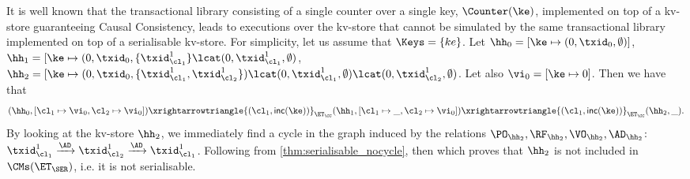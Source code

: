 It is well known that the transactional library consisting of a single counter over a single 
key, $\Counter(\ke)$, implemented on top of a kv-store guaranteeing Causal Consistency, 
leads to executions over the kv-store that cannot be simulated by the same transactional 
library implemented on top of a serialisable kv-store. 
For simplicity, let us assume that $\Keys = \{ke\}$.
Let $\hh_{0} = [\ke \mapsto (0, \txid_{0}, \emptyset)]$,  
$\hh_1 = [\ke \mapsto (0, \txid_{0}, \{\txid_{\cl_1}^{1}\} \lcat (0, \txid_{\cl_1}^{1}, \emptyset)$, 
$\hh_2 = [\ke \mapsto (0, \txid_{0}, \{\txid_{\cl_1}^{1}, \txid_{\cl_2}^{1}\}) \lcat (0, \txid_{\cl_1}^{1}, \emptyset) 
\lcat (0, \txid_{\cl_2}^{1}, \emptyset)$. Let also
$\vi_{0} = [\ke \mapsto {0}]$. Then we have that 
\[
(\hh_{0}, [\cl_1 \mapsto \vi_0, \cl_2 \mapsto \vi_0]) \xrightarrowtriangle{(\cl_1, \mathsf{inc(\ke)})}_{\ET_{\CC}} 
(\hh_1, [\cl_1 \mapsto \_, \cl_2 \mapsto \vi_0]) \xrightarrowtriangle{(\cl_1, \mathsf{inc(\ke)})}_{\ET_{\CC}} 
(\hh_2, \_).
\]
By looking at the kv-store $\hh_{2}$, we immediately find a cycle in the graph induced by 
the relations $\PO_{\hh_{2}}, \RF_{\hh_{2}}, \VO_{\hh_{2}}, \AD_{\hh_{2}}$: 
$\txid_{\cl_1}^{1} \xrightarrow{\AD} \txid_{\cl_2}^{1} \xrightarrow{\AD} \txid_{\cl_1}^{1}$. 
Following from \cref{thm:serialisable_nocycle}, then 
which proves that $\hh_2$ is not included in $\CMs(\ET_{\SER})$, i.e. it is 
not serialisable.

